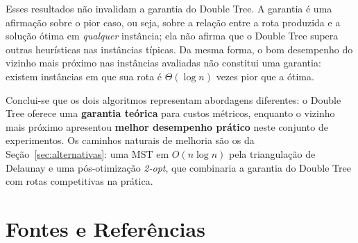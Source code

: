 \documentclass[11pt,a4paper]{article}
\renewcommand{\_}{\underscoreoriginal\allowbreak}
\begin{document}
Esses resultados não invalidam a garantia do Double Tree. A garantia é
uma afirmação sobre o pior caso, ou seja, sobre a relação entre a rota
produzida e a solução ótima em \emph{qualquer} instância; ela não
afirma que o Double Tree supera outras heurísticas nas instâncias
típicas. Da mesma forma, o bom desempenho do vizinho mais próximo nas
instâncias avaliadas não constitui uma garantia: existem instâncias em
que sua rota é $\Theta(\log n)$ vezes pior que a ótima.

Conclui-se que os dois algoritmos representam abordagens diferentes: o
Double Tree oferece uma \textbf{garantia teórica} para custos métricos,
enquanto o vizinho mais próximo apresentou \textbf{melhor desempenho
prático} neste conjunto de experimentos. Os caminhos naturais de
melhoria são os da Seção~\ref{sec:alternativas}: uma MST em
$O(n\log n)$ pela triangulação de Delaunay e uma pós-otimização
\emph{2-opt}, que combinaria a garantia do Double Tree com rotas
competitivas na prática.

\section{Fontes e Referências}
\end{document}
